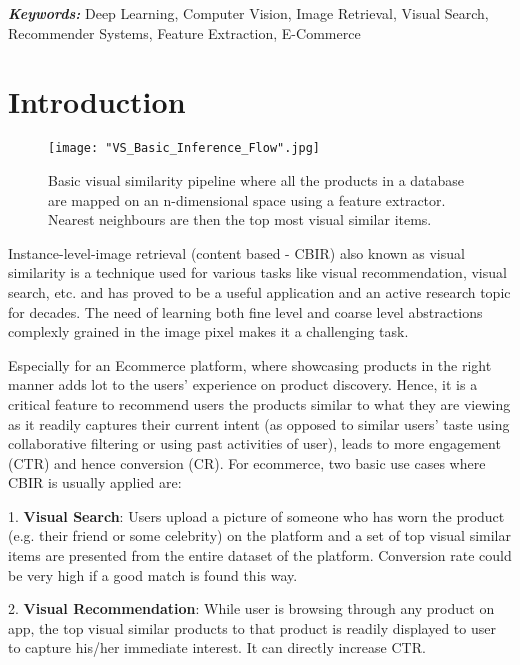 \documentclass[10pt,twocolumn,letterpaper]{article}
\providecommand{\keywords}[1]{\textbf{\textit{Keywords:}} #1}
\begin{document}
\keywords{Deep Learning, Computer Vision, Image Retrieval, Visual Search, Recommender Systems, Feature Extraction, E-Commerce}

\vspace{-4mm}
\section{Introduction}\vspace{-1mm}

\begin{figure*}[htp]
\centering
\texttt{[image: "VS\_Basic\_Inference\_Flow".jpg]}
\caption{Basic visual similarity pipeline where all the products in a database are mapped on an n-dimensional space using a feature extractor. Nearest neighbours are then the top most visual similar items.}
\label{fig:vs_basic_flow}
\end{figure*}

Instance-level-image retrieval (content based - CBIR) also known as visual similarity is a technique used for various tasks like visual recommendation, visual search, etc. and has proved to be a useful application and an active research topic for decades. The need of learning both fine level and coarse level abstractions complexly grained in the image pixel makes it a challenging task. 

Especially for an Ecommerce platform, where showcasing products in the right manner adds lot to the users' experience on product discovery. Hence, it is a critical feature to recommend users the products similar to what they are viewing as it readily captures their current intent (as opposed to similar users' taste using collaborative filtering or using past activities of user), leads to more engagement (CTR) and hence conversion (CR). For ecommerce, two basic use cases where CBIR is usually applied are:

1. \textbf{Visual Search}: Users upload a picture of someone who has worn the product (e.g. their friend or some celebrity) on the platform and a set of top visual similar items are presented from the entire dataset of the platform. Conversion rate could be very high if a good match is found this way.

2. \textbf{Visual Recommendation}: While user is browsing through any product on app, the top visual similar products to that product is readily displayed to user to capture his/her immediate interest. It can directly increase CTR.
\end{document}
